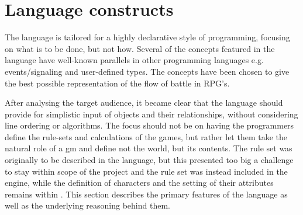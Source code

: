 \section{Language constructs}
The \langname{} language is tailored for a highly declarative style of programming, focusing on what is to be done, but not how. Several of the concepts featured in the language have well-known
parallels in other programming languages e.g. events/signaling and user-defined types. The concepts have been chosen to give the best possible representation of the flow of battle in RPG's.

After analysing the target audience, it became clear that the language should provide for
simplistic input of objects and their relationships, without considering line
ordering or algorithms. The focus should not be on having the programmers define the rule-sets
and calculations of the games, but rather let them take the natural role of a \ac{gm}
and define not the world, but its contents. The rule set was originally to be described in the
language, but this presented too big a challenge to stay within scope of the project and the rule set was instead included in the engine, while the definition of characters and the setting of their attributes remains within \langname{}. This section describes the primary features of the
\langname{} language as well as the underlying reasoning behind them.
